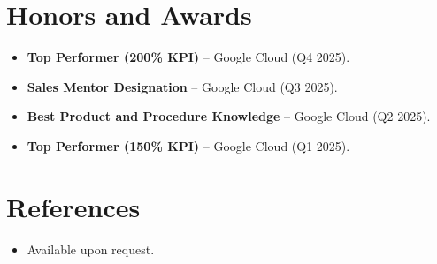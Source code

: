 \documentclass[11pt,a4paper,sans]{moderncv}
\begin{document}
\section{Honors and Awards}
\vspace{1pt}
\begin{itemize}
\item{\textbf{Top Performer (200\% KPI)} -- Google Cloud (Q4 2025).}
\item{\textbf{Sales Mentor Designation} -- Google Cloud (Q3 2025).}
\item{\textbf{Best Product and Procedure Knowledge} -- Google Cloud (Q2 2025).}
\item{\textbf{Top Performer (150\% KPI)} -- Google Cloud (Q1 2025).}
\end{itemize}


\section{References}
\vspace{1pt}
\begin{itemize}
\item{Available upon request.}
\end{itemize}
\end{document}
